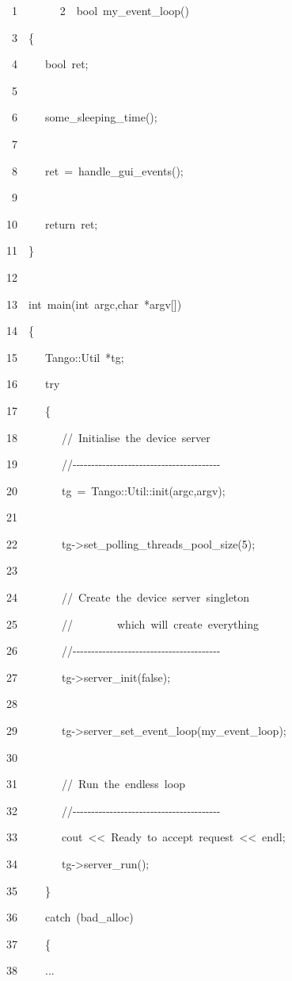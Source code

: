 \begin{lyxcode}
~~~~~1~~
~~~~~2~~bool~my\_event\_loop()

~~~~~3~~\{

~~~~~4~~~~~bool~ret;

~~~~~5~~

~~~~~6~~~~~some\_sleeping\_time();

~~~~~7~~

~~~~~8~~~~~ret~=~handle\_gui\_events();

~~~~~9~~

~~~~10~~~~~return~ret;

~~~~11~~\}

~~~~12~~

~~~~13~~int~main(int~argc,char~{*}argv{[}{]})

~~~~14~~\{

~~~~15~~~~~Tango::Util~{*}tg;

~~~~16~~~~~try

~~~~17~~~~~\{

~~~~18~~~~~~~~//~Initialise~the~device~server

~~~~19~~~~~~~~//-{}-{}-{}-{}-{}-{}-{}-{}-{}-{}-{}-{}-{}-{}-{}-{}-{}-{}-{}-{}-{}-{}-{}-{}-{}-{}-{}-{}-{}-{}-{}-{}-{}-{}-{}-{}-{}-{}-{}-

~~~~20~~~~~~~~tg~=~Tango::Util::init(argc,argv);

~~~~21~~

~~~~22~~~~~~~~tg->set\_polling\_threads\_pool\_size(5);

~~~~23~~

~~~~24~~~~~~~~//~Create~the~device~server~singleton~

~~~~25~~~~~~~~//~~~~~~~~which~will~create~everything

~~~~26~~~~~~~~//-{}-{}-{}-{}-{}-{}-{}-{}-{}-{}-{}-{}-{}-{}-{}-{}-{}-{}-{}-{}-{}-{}-{}-{}-{}-{}-{}-{}-{}-{}-{}-{}-{}-{}-{}-{}-{}-{}-{}-

~~~~27~~~~~~~~tg->server\_init(false);

~~~~28~~

~~~~29~~~~~~~~tg->server\_set\_event\_loop(my\_event\_loop);

~~~~30~~

~~~~31~~~~~~~~//~Run~the~endless~loop

~~~~32~~~~~~~~//-{}-{}-{}-{}-{}-{}-{}-{}-{}-{}-{}-{}-{}-{}-{}-{}-{}-{}-{}-{}-{}-{}-{}-{}-{}-{}-{}-{}-{}-{}-{}-{}-{}-{}-{}-{}-{}-{}-{}-

~~~~33~~~~~~~~cout~<\textcompwordmark{}<~\textquotedbl{}Ready~to~accept~request\textquotedbl{}~<\textcompwordmark{}<~endl;

~~~~34~~~~~~~~tg->server\_run();

~~~~35~~~~~\}

~~~~36~~~~~catch~(bad\_alloc)

~~~~37~~~~~\{

~~~~38~~~~~...
\end{lyxcode}


